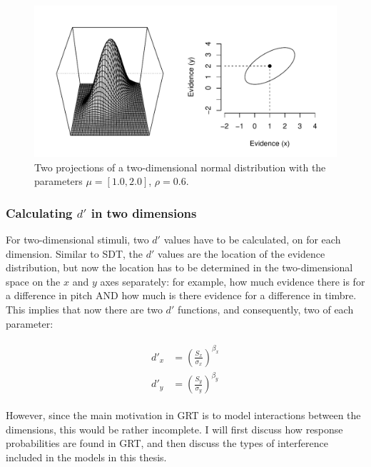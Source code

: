 \documentclass{article}\usepackage{knitr}
\begin{document}
\begin{figure}
\centering
\begin{knitrout}
\color{fgcolor}
\includegraphics[width=\maxwidth]{figure/unnamed-chunk-7-1} 

\end{knitrout}
\caption{Two projections of a two-dimensional normal distribution with the parameters $\mu = [1.0, 2.0]$, $\rho = 0.6$.} 
\label{fig:2dimnorm}
\end{figure}

\subsubsection{Calculating $d'$ in two dimensions}

For two-dimensional stimuli, two $d'$ values have to be calculated, on for each dimension. Similar to SDT, the $d'$ values are the location of the evidence distribution, but now the location has to be determined in the two-dimensional space on the $x$ and $y$ axes separately: for example, how much evidence there is for a difference in pitch AND how much is there evidence for a difference in timbre. This implies that now there are two $d'$ functions, and consequently, two of each parameter: 

\begin{align}
\label{eq:twodimdprime}
\begin{split}
d'_x &= (\frac{S_x}{\sigma_x})^{\beta_x}\\
d'_y &= (\frac{S_y}{\sigma_y})^{\beta_y}
\end{split}
\end{align}

However, since the main motivation in GRT is to model interactions between the dimensions, this would be rather incomplete. I will first discuss how response probabilities are found in GRT, and then discuss the types of interference included in the models in this thesis.
\end{document}

